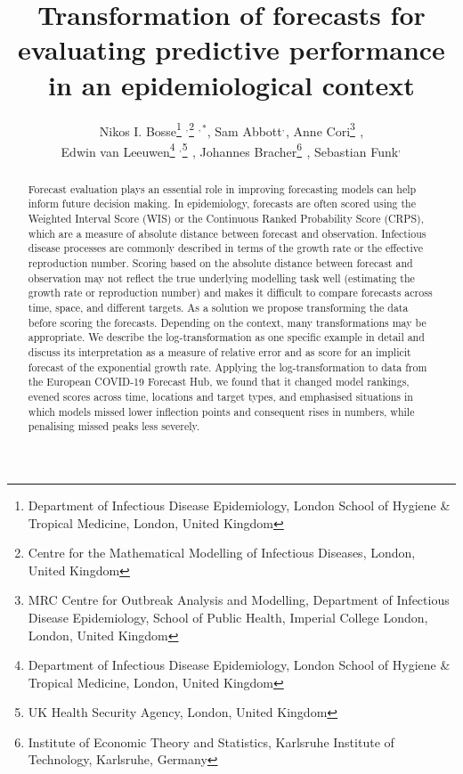 \documentclass{article}
\begin{document}
\title{Transformation of forecasts for evaluating predictive performance in an epidemiological context}
  \author{Nikos I. Bosse\thanks{Department of Infectious Disease Epidemiology, London School of Hygiene \& Tropical Medicine, London, United Kingdom} $^{,}$\thanks{Centre for the Mathematical Modelling of Infectious Diseases, London, United Kingdom} $^{,*}$, 
  Sam Abbott\footnotemark[1] $^{,}$\footnotemark[2]$ ^{}$, 
  Anne Cori\thanks{MRC Centre for Outbreak Analysis and Modelling, Department of Infectious Disease Epidemiology, School of Public Health, Imperial College London, London, United Kingdom} $^{}$, \\
  Edwin van Leeuwen\thanks{Department of Infectious Disease Epidemiology, London School of Hygiene \& Tropical Medicine, London, United Kingdom} $^{,}$\thanks{UK Health Security Agency, London, United Kingdom} $^{}$, 
  Johannes Bracher\thanks{Institute of Economic Theory and Statistics, Karlsruhe Institute of Technology, Karlsruhe, Germany} $^{}$, 
  Sebastian Funk\footnotemark[1] $^{,}$\footnotemark[2]$ ^{}$}



\maketitle
\begin{abstract}
Forecast evaluation plays an essential role in improving forecasting models can help inform future decision making. In epidemiology, forecasts are often scored using the Weighted Interval Score (WIS) or the Continuous Ranked Probability Score (CRPS), which are a measure of absolute distance between forecast and observation. Infectious disease processes are commonly described in terms of the growth rate or the effective reproduction number. Scoring based on the absolute distance between forecast and observation may not reflect the true underlying modelling task well (estimating the growth rate or reproduction number) and makes it difficult to compare forecasts across time, space, and different targets. As a solution we propose transforming the data before scoring the forecasts. Depending on the context, many transformations may be appropriate. We describe the log-transformation as one specific example in detail and discuss its interpretation as a measure of relative error and as score for an implicit forecast of the exponential growth rate. Applying the log-transformation to data from the European COVID-19 Forecast Hub, we found that it changed model rankings, evened scores across time, locations and target types, and emphasised situations in which models missed lower inflection points and consequent rises in numbers, while penalising missed peaks less severely. 
\end{abstract}
\end{document}
